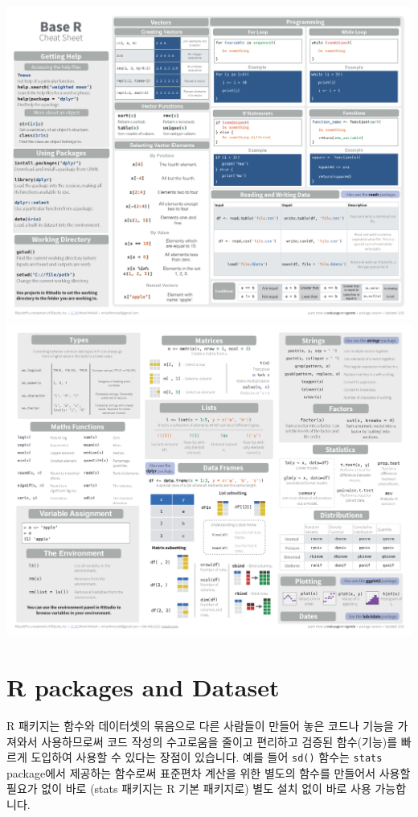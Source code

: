 \documentclass[
]{book}
\begin{document}
\includegraphics[width=5.72917in,height=\textheight]{images/01/base-r_1.png}
\includegraphics[width=5.72917in,height=\textheight]{images/01/base-r_2.png}

\hypertarget{r-packages-and-dataset}{%
\section{R packages and Dataset}\label{r-packages-and-dataset}}

R 패키지는 함수와 데이터셋의 묶음으로 다른 사람들이 만들어 놓은 코드나 기능을 가져와서 사용하므로써 코드 작성의 수고로움을 줄이고 편리하고 검증된 함수(기능)를 빠르게 도입하여 사용할 수 있다는 장점이 있습니다. 예를 들어 \texttt{sd()} 함수는 \texttt{stats} package에서 제공하는 함수로써 표준편차 계산을 위한 별도의 함수를 만들어서 사용할 필요가 없이 바로 (stats 패키지는 R 기본 패키지로) 별도 설치 없이 바로 사용 가능합니다.
\end{document}
